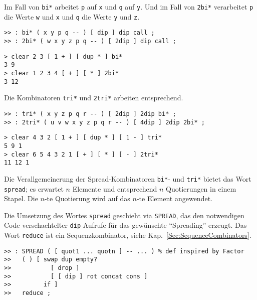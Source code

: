 Im Fall von \verb|bi*| arbeitet \verb|p| auf \verb|x| und \verb|q| auf \verb|y|. Und im Fall von \verb|2bi*| verarbeitet \verb|p| die Werte \verb|w| und \verb|x| und \verb|q| die Werte \verb|y| und \verb|z|.

\begin{verbatim}
>> : bi* ( x y p q -- ) [ dip ] dip call ;
>> : 2bi* ( w x y z p q -- ) [ 2dip ] dip call ;
\end{verbatim}

\begin{verbatim}
> clear 2 3 [ 1 + ] [ dup * ] bi*
3 9
> clear 1 2 3 4 [ + ] [ * ] 2bi*
3 12
\end{verbatim}

Die Kombinatoren \verb|tri*| und \verb|2tri*| arbeiten entsprechend.

\begin{verbatim}
>> : tri* ( x y z p q r -- ) [ 2dip ] 2dip bi* ;
>> : 2tri* ( u v w x y z p q r -- ) [ 4dip ] 2dip 2bi* ;
\end{verbatim}

\begin{verbatim}
> clear 4 3 2 [ 1 + ] [ dup * ] [ 1 - ] tri*
5 9 1
> clear 6 5 4 3 2 1 [ + ] [ * ] [ - ] 2tri*
11 12 1
\end{verbatim}

Die Verallgemeinerung der Spread-Kombinatoren \verb|bi*|- und \verb|tri*| bietet das Wort \verb|spread|; es erwartet $n$ Elemente und entsprechend $n$ Quotierungen in einem Stapel. Die $n$-te Quotierung wird auf das $n$-te Element angewendet.

Die Umsetzung des Wortes \verb|spread| geschieht via \verb|SPREAD|, das den notwendigen Code verschachtelter \verb|dip|-Aufrufe für das gewünschte "`Spreading"' erzeugt. Das Wort \verb|reduce| ist ein Sequenzkombinator, siehe Kap.~\ref{Sec:SequenceCombinators}.

\begin{verbatim}
>> : SPREAD ( [ quot1 ... quotn ] -- ... ) % def inspired by Factor
>>   ( ) [ swap dup empty?
>>           [ drop ]
>>           [ [ dip ] rot concat cons ]
>>         if ]
>>   reduce ;
\end{verbatim}

